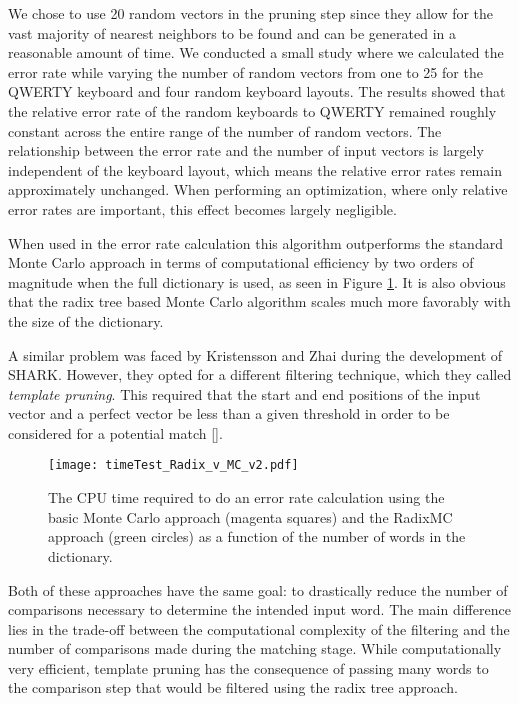 \documentclass[final,1p,times,authoryear]{elsarticle}
\begin{document}
We chose to use 20 random vectors in the pruning step since they allow for the vast majority of nearest neighbors to be found and can be generated in a reasonable amount of time.
We conducted a small study where we calculated the error rate while varying the number of random vectors from one to 25 for the QWERTY keyboard and four random keyboard layouts.
The results showed that the relative error rate of the random keyboards to QWERTY remained roughly constant across the entire range of the number of random vectors.
The relationship between the error rate and the number of input vectors is largely independent of the keyboard layout, which means the relative error rates remain approximately unchanged.
When performing an optimization, where only relative error rates are important, this effect becomes largely negligible.

When used in the error rate calculation this algorithm outperforms the standard Monte Carlo approach in terms of computational efficiency by two orders of magnitude when the full dictionary is used, as seen in Figure \ref{fig:The-cpu-time}.
It is also obvious that the radix tree based Monte Carlo algorithm scales much more favorably with the size of the dictionary.

A similar problem was faced by Kristensson and Zhai during the development of SHARK.
However, they opted for a different filtering technique, which they called \textit{template pruning}.
This required that the start and end positions of the input vector and a perfect vector be less than a given threshold in order to be considered for a potential match [\cite{SHARK2}].

\begin{figure}[t]
\begin{centering}
\texttt{[image: timeTest\_Radix\_v\_MC\_v2.pdf]}
\par\end{centering}
\smallskip{}
\protect\caption{The CPU time required to do an error rate calculation using the basic
Monte Carlo approach (magenta squares) and the RadixMC approach (green circles) as
a function of the number of words in the dictionary.\label{fig:The-cpu-time}}
\end{figure}

Both of these approaches have the same goal: to drastically reduce the number of comparisons necessary to determine the intended input word.
The main difference lies in the trade-off between the computational complexity of the filtering and the number of comparisons made during the matching stage.
While computationally very efficient, template pruning has the consequence of passing many words to the comparison step that would be filtered using the radix tree approach.
\end{document}
